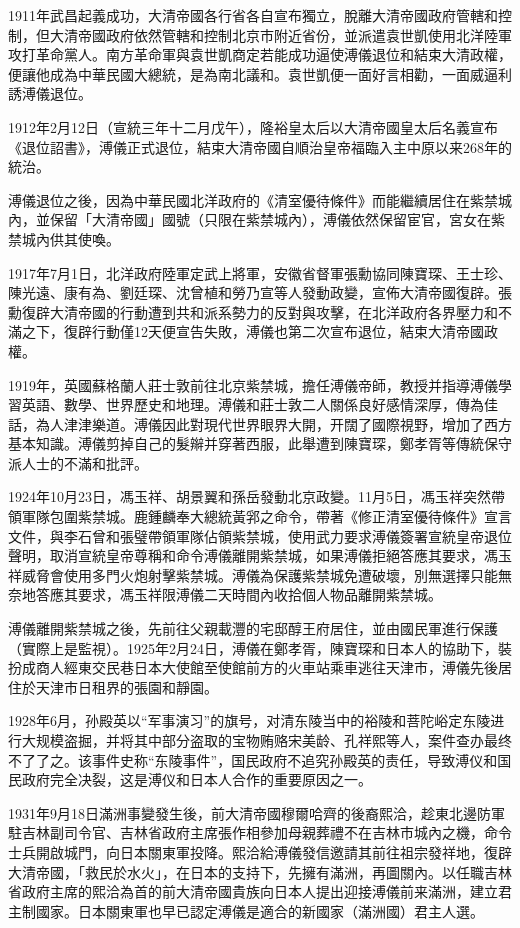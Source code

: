 1911年武昌起義成功，大清帝國各行省各自宣布獨立，脫離大清帝國政府管轄和控制，但大清帝國政府依然管轄和控制北京市附近省份，並派遣袁世凱使用北洋陸軍攻打革命黨人。南方革命軍與袁世凱商定若能成功逼使溥儀退位和結束大清政權，便讓他成為中華民國大總統，是為南北議和。袁世凱便一面好言相勸，一面威逼利誘溥儀退位。

1912年2月12日（宣統三年十二月戊午），隆裕皇太后以大清帝國皇太后名義宣布《退位詔書》，溥儀正式退位，結束大清帝國自順治皇帝福臨入主中原以来268年的統治。

溥儀退位之後，因為中華民國北洋政府的《清室優待條件》而能繼續居住在紫禁城內，並保留「大清帝國」國號（只限在紫禁城內），溥儀依然保留宦官，宮女在紫禁城內供其使喚。

1917年7月1日，北洋政府陸軍定武上將軍，安徽省督軍張勳協同陳寶琛、王士珍、陳光遠、康有為、劉廷琛、沈曾植和勞乃宣等人發動政變，宣佈大清帝國復辟。張勳復辟大清帝國的行動遭到共和派系勢力的反對與攻擊，在北洋政府各界壓力和不滿之下，復辟行動僅12天便宣告失敗，溥儀也第二次宣布退位，結束大清帝國政權。

1919年，英國蘇格蘭人莊士敦前往北京紫禁城，擔任溥儀帝師，教授并指導溥儀學習英語、數學、世界歷史和地理。溥儀和莊士敦二人關係良好感情深厚，傳為佳話，為人津津樂道。溥儀因此對現代世界眼界大開，开闊了國際視野，增加了西方基本知識。溥儀剪掉自己的髮辮并穿著西服，此舉遭到陳寶琛，鄭孝胥等傳統保守派人士的不滿和批評。

1924年10月23日，馮玉祥、胡景翼和孫岳發動北京政變。11月5日，馮玉祥突然帶領軍隊包圍紫禁城。鹿鍾麟奉大總統黃郛之命令，帶著《修正清室優待條件》宣言文件，與李石曾和張璧帶領軍隊佔領紫禁城，使用武力要求溥儀簽署宣統皇帝退位聲明，取消宣統皇帝尊稱和命令溥儀離開紫禁城，如果溥儀拒絕答應其要求，馮玉祥威脅會使用多門火炮射擊紫禁城。溥儀為保護紫禁城免遭破壞，別無選擇只能無奈地答應其要求，馮玉祥限溥儀二天時間內收拾個人物品離開紫禁城。

溥儀離開紫禁城之後，先前往父親載灃的宅邸醇王府居住，並由國民軍進行保護（實際上是監視）。1925年2月24日，溥儀在鄭孝胥，陳寶琛和日本人的協助下，裝扮成商人經東交民巷日本大使館至使館前方的火車站乘車逃往天津市，溥儀先後居住於天津市日租界的張園和靜園。

1928年6月，孙殿英以“军事演习”的旗号，对清东陵当中的裕陵和菩陀峪定东陵进行大规模盗掘，并将其中部分盗取的宝物贿赂宋美龄、孔祥熙等人，案件查办最终不了了之。该事件史称“东陵事件”，国民政府不追究孙殿英的责任，导致溥仪和国民政府完全决裂，这是溥仪和日本人合作的重要原因之一。

1931年9月18日滿洲事變發生後，前大清帝國穆爾哈齊的後裔熙洽，趁東北邊防軍駐吉林副司令官、吉林省政府主席張作相參加母親葬禮不在吉林市城內之機，命令士兵開啟城門，向日本關東軍投降。熙洽給溥儀發信邀請其前往祖宗發祥地，復辟大清帝國，「救民於水火」，在日本的支持下，先擁有滿洲，再圖關內。以任職吉林省政府主席的熙洽為首的前大清帝國貴族向日本人提出迎接溥儀前来滿洲，建立君主制國家。日本關東軍也早已認定溥儀是適合的新國家（滿洲國）君主人選。

